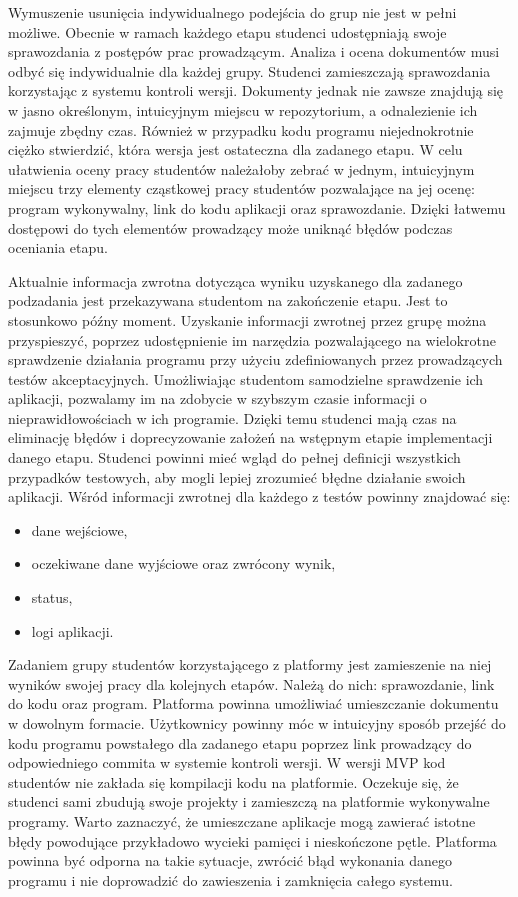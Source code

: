 Wymuszenie usunięcia indywidualnego podejścia do grup nie jest w pełni możliwe. 
Obecnie w ramach każdego etapu studenci udostępniają swoje sprawozdania z postępów prac prowadzącym.
Analiza i ocena dokumentów musi odbyć się indywidualnie dla każdej grupy.
Studenci zamieszczają sprawozdania korzystając z systemu kontroli wersji.
Dokumenty jednak nie zawsze znajdują się w jasno określonym, intuicyjnym miejscu w repozytorium, a odnalezienie ich zajmuje zbędny czas.
Również w przypadku kodu programu niejednokrotnie ciężko stwierdzić, która wersja jest ostateczna dla zadanego etapu.
W celu ułatwienia oceny pracy studentów należałoby zebrać w jednym, intuicyjnym miejscu trzy elementy cząstkowej pracy studentów pozwalające na jej ocenę: program wykonywalny, link do kodu aplikacji oraz sprawozdanie.
Dzięki łatwemu dostępowi do tych elementów prowadzący może uniknąć błędów podczas oceniania etapu.
 
Aktualnie informacja zwrotna dotycząca wyniku uzyskanego dla zadanego podzadania jest przekazywana studentom na zakończenie etapu.
Jest to stosunkowo późny moment.
Uzyskanie informacji zwrotnej przez grupę można przyspieszyć, poprzez udostępnienie im narzędzia pozwalającego na wielokrotne sprawdzenie działania programu przy użyciu zdefiniowanych przez prowadzących testów akceptacyjnych.
Umożliwiając studentom samodzielne sprawdzenie ich aplikacji, pozwalamy im na zdobycie w szybszym czasie informacji o nieprawidłowościach w ich programie.
Dzięki temu studenci mają czas na eliminację błędów i doprecyzowanie założeń na wstępnym etapie implementacji danego etapu.
Studenci powinni mieć wgląd do pełnej definicji wszystkich przypadków testowych, aby mogli lepiej zrozumieć błędne działanie swoich aplikacji.
Wśród informacji zwrotnej dla każdego z testów powinny znajdować się:
\begin{itemize}
\item dane wejściowe,
\item oczekiwane dane wyjściowe oraz zwrócony wynik,
\item status,
\item logi aplikacji.
\end{itemize}

Zadaniem grupy studentów korzystającego z platformy jest zamieszenie na niej wyników swojej pracy dla kolejnych etapów.
Należą do nich: sprawozdanie, link do kodu oraz program.
Platforma powinna umożliwiać umieszczanie dokumentu w dowolnym formacie.
Użytkownicy powinny móc w intuicyjny sposób przejść do kodu programu powstałego dla zadanego etapu poprzez link prowadzący do odpowiedniego commita w systemie kontroli wersji.
W wersji MVP kod studentów nie zakłada się kompilacji kodu na platformie.
Oczekuje się, że studenci sami zbudują swoje projekty i zamieszczą na platformie wykonywalne programy.
Warto zaznaczyć, że umieszczane aplikacje mogą zawierać istotne błędy powodujące przykładowo wycieki pamięci i nieskończone pętle.
Platforma powinna być odporna na takie sytuacje, zwrócić błąd wykonania danego programu i nie doprowadzić do zawieszenia i zamknięcia całego systemu.

